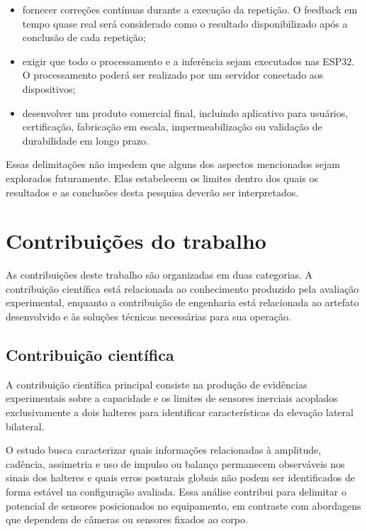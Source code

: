 \begin{itemize}
    \item fornecer correções contínuas durante a execução da repetição.
    O feedback em tempo quase real será considerado como o resultado
    disponibilizado após a conclusão de cada repetição;

    \item exigir que todo o processamento e a inferência sejam
    executados nas ESP32. O processamento poderá ser realizado por um
    servidor conectado aos dispositivos;

    \item desenvolver um produto comercial final, incluindo aplicativo
    para usuários, certificação, fabricação em escala, impermeabilização
    ou validação de durabilidade em longo prazo.
\end{itemize}

Essas delimitações não impedem que alguns dos aspectos mencionados sejam
explorados futuramente. Elas estabelecem os limites dentro dos quais os
resultados e as conclusões desta pesquisa deverão ser interpretados.

\section{Contribuições do trabalho}
\label{sec:contribuicoes}

As contribuições deste trabalho são organizadas em duas categorias. A
contribuição científica está relacionada ao conhecimento produzido pela
avaliação experimental, enquanto a contribuição de engenharia está
relacionada ao artefato desenvolvido e às soluções técnicas necessárias
para sua operação.

\subsection{Contribuição científica}
\label{subsec:contribuicao-cientifica}

A contribuição científica principal consiste na produção de evidências
experimentais sobre a capacidade e os limites de sensores inerciais
acoplados exclusivamente a dois halteres para identificar características
da elevação lateral bilateral.

O estudo busca caracterizar quais informações relacionadas à amplitude,
cadência, assimetria e uso de impulso ou balanço permanecem observáveis
nos sinais dos halteres e quais erros posturais globais não podem ser
identificados de forma estável na configuração avaliada. Essa análise
contribui para delimitar o potencial de sensores posicionados no
equipamento, em contraste com abordagens que dependem de câmeras ou
sensores fixados ao corpo.


